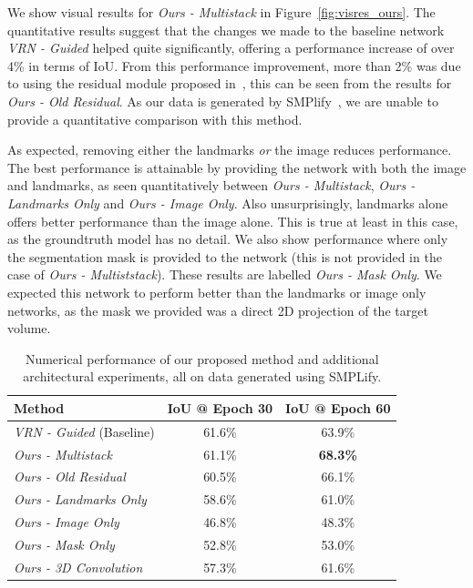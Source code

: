 We show visual results for \textit{Ours - Multistack} in
Figure~\ref{fig:visres_ours}. The quantitative results suggest that
the changes we made to the baseline network \textit{VRN - Guided}
helped quite significantly, offering a performance increase of over
4\% in terms of IoU. From this performance improvement, more than 2\%
was due to using the residual module proposed
in~\cite{bulat2017binarized}, this can be seen from the results for
\textit{Ours - Old Residual}. As our data is generated by
SMPlify~\cite{bogo2016smplify}, we are unable to provide a
quantitative comparison with this method.

As expected, removing either the landmarks \textit{or} the image
reduces performance. The best performance is attainable by providing
the network with both the image and landmarks, as seen quantitatively
between \textit{Ours - Multistack}, \textit{Ours - Landmarks Only} and
\textit{Ours - Image Only}. Also unsurprisingly, landmarks alone
offers better performance than the image alone. This is true at least
in this case, as the groundtruth model has no detail. We also show
performance where only the segmentation mask is provided to the
network (this is not provided in the case of \textit{Ours -
  Multiststack}). These results are labelled \textit{Ours - Mask
  Only}. We expected this network to perform better than the landmarks
or image only networks, as the mask we provided was a direct 2D
projection of the target volume.


\begin{table}
  \caption[Numerical performance of human body
  reconstruction]{Numerical performance of our proposed method and
    additional architectural experiments, all on data generated using
    SMPLify.}
  \label{tab:results}
  \centering
  \begin{tabular}{|l||c|c|}
    \hline
    \textbf{Method} & \textbf{IoU @ Epoch 30}  & \textbf{IoU @ Epoch 60} \\
    \hline\hline
    \textit{VRN - Guided}  (Baseline)  & 61.6\% & 63.9\% \\
    \hline
    \textit{Ours - Multistack}         & 61.1\% & \textbf{68.3\%} \\
    \textit{Ours - Old Residual}       & 60.5\% & 66.1\% \\
    \hline
    \textit{Ours - Landmarks Only}     & 58.6\% & 61.0\%  \\
    \textit{Ours - Image Only}         & 46.8\% & 48.3\% \\
    \textit{Ours - Mask Only}          & 52.8\% & 53.0\%\\
    \hline
    \textit{Ours - 3D Convolution}     & 57.3\% & 61.6\%\\

    \hline
\end{tabular}
\end{table}

